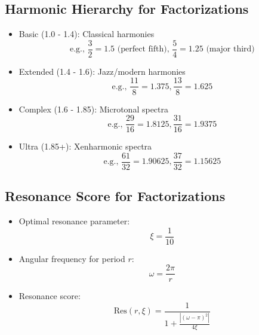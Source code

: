 \documentclass[12pt,a4paper]{article}
\begin{document}
	\subsection{Harmonic Hierarchy for Factorizations}
	\begin{itemize}
		\item Basic (1.0 - 1.4): Classical harmonies
		$$\text{e.g., } \frac{3}{2} = 1.5 \text{ (perfect fifth), } \frac{5}{4} = 1.25 \text{ (major third)}$$
		
		\item Extended (1.4 - 1.6): Jazz/modern harmonies
		$$\text{e.g., } \frac{11}{8} = 1.375, \frac{13}{8} = 1.625$$
		
		\item Complex (1.6 - 1.85): Microtonal spectra
		$$\text{e.g., } \frac{29}{16} = 1.8125, \frac{31}{16} = 1.9375$$
		
		\item Ultra (1.85+): Xenharmonic spectra
		$$\text{e.g., } \frac{61}{32} = 1.90625, \frac{37}{32} = 1.15625$$
	\end{itemize}
	
	\subsection{Resonance Score for Factorizations}
	\begin{itemize}
		\item Optimal resonance parameter:
		$$\xi = \frac{1}{10}$$
		
		\item Angular frequency for period $r$:
		$$\omega = \frac{2\pi}{r}$$
		
		\item Resonance score:
		$$\text{Res}(r,\xi) = \frac{1}{1 + \frac{|(\omega-\pi)^2|}{4\xi}}$$
	\end{itemize}
	
\end{document}
